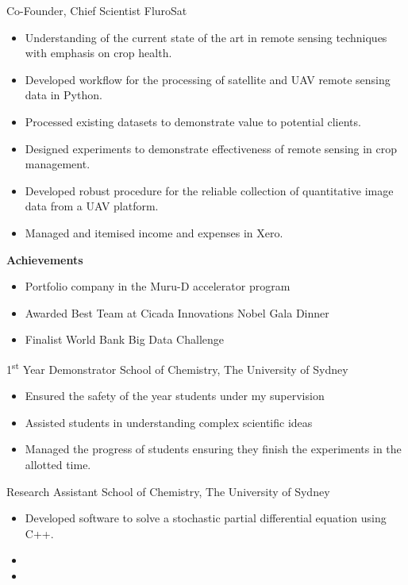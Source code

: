 {Co-Founder, Chief Scientist}
{FluroSat}{}{}
{%
  \begin{itemize}
    \item Understanding of the current state of the art in remote sensing techniques with emphasis on crop health.
    \item Developed workflow for the processing of satellite and UAV remote sensing data in Python.
    \item Processed existing datasets to demonstrate value to potential clients.
    \item Designed experiments to demonstrate effectiveness of remote sensing in crop management.
    \item Developed robust procedure for the reliable collection of quantitative image data from a UAV platform.
    \item Managed and itemised income and expenses in Xero.
  \end{itemize}
  \textbf{Achievements}
  \begin{itemize}
    \item Portfolio company in the Muru-D accelerator program
    \item Awarded Best Team at Cicada Innovations Nobel Gala Dinner
    \item Finalist World Bank Big Data Challenge
  \end{itemize}
}
\vspace{1em}

{1\textsuperscript{st} Year Demonstrator}
{School of Chemistry, The University of Sydney}
{}{}
{%
  \begin{itemize}
    \item Ensured the safety of the  year students under my supervision
    \item Assisted students in understanding complex scientific ideas
    \item Managed the progress of students ensuring they finish the experiments in the allotted time.
  \end{itemize}
}
\vspace{1em}

{Research Assistant}
{School of Chemistry, The University of Sydney}
{}{}{%
  \begin{itemize}
    \item Developed software to solve a stochastic partial differential equation using C++.
    \item %
    \item %
  \end{itemize}
}
\vspace{1em}

